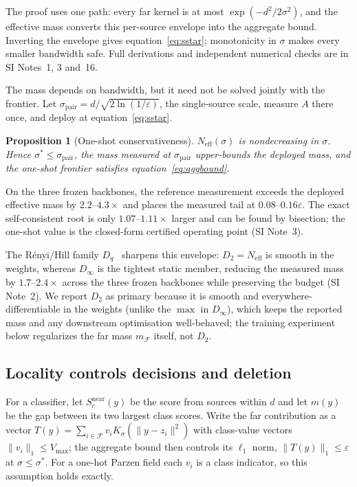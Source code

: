 \documentclass[10pt,twocolumn]{article}
\newtheorem{proposition}{Proposition}
\newcommand{\Ksig}{K_{\sigma}}
\newcommand{\sstar}{\sigma^{*}}
\newcommand{\Neff}{N_{\mathrm{eff}}}
\begin{document}
The proof uses one path: every far kernel is at most $\exp(-d^2/2\sigma^2)$, and the effective mass converts this per-source envelope into the aggregate bound. Inverting the envelope gives equation~\eqref{eq:sstar}; monotonicity in $\sigma$ makes every smaller bandwidth safe. Full derivations and independent numerical checks are in SI Notes~1, 3 and~16.

The mass depends on bandwidth, but it need not be solved jointly with the frontier. Let $\sigma_{\mathrm{pair}}=d/\sqrt{2\ln(1/\varepsilon)}$, the single-source scale, measure $A$ there once, and deploy at equation~\eqref{eq:sstar}.

\begin{proposition}[One-shot conservativeness]\label{prop:conserv}
$\Neff(\sigma)$ is nondecreasing in $\sigma$. Hence $\sstar\le\sigma_{\mathrm{pair}}$, the mass measured at $\sigma_{\mathrm{pair}}$ upper-bounds the deployed mass, and the one-shot frontier satisfies equation~\eqref{eq:aggbound}.
\end{proposition}

On the three frozen backbones, the reference measurement exceeds the deployed effective mass by $2.2$--$4.3\times$ and places the measured tail at $0.08$--$0.16\varepsilon$. The exact self-consistent root is only $1.07$--$1.11\times$ larger and can be found by bisection; the one-shot value is the closed-form certified operating point (SI Note~3).

The R\'enyi/Hill family $D_q$~\cite{hill1973,renyi1961} sharpens this envelope: $D_2=\Neff$ is smooth in the weights, whereas $D_{\infty}$ is the tightest static member, reducing the measured mass by $1.7$--$2.4\times$ across the three frozen backbones while preserving the budget (SI Note~2). We report $D_2$ as primary because it is smooth and everywhere-differentiable in the weights (unlike the $\max$ in $D_{\infty}$), which keeps the reported mass and any downstream optimisation well-behaved; the training experiment below regularizes the far mass $m_{\mathcal{F}}$ itself, not $D_2$.

\subsection{Locality controls decisions and deletion}\label{sec:locality}

For a classifier, let $S_c^{\mathrm{near}}(y)$ be the score from sources within $d$ and let $m(y)$ be the gap between its two largest class scores. Write the far contribution as a vector $T(y)=\sum_{i\in\mathcal{F}}v_i\Ksig(\lVert y-z_i\rVert^2)$ with class-value vectors $\lVert v_i\rVert_1\le V_{\max}$; the aggregate bound then controls its $\ell_1$ norm, $\lVert T(y)\rVert_1\le\varepsilon$ at $\sigma\le\sstar$. For a one-hot Parzen field each $v_i$ is a class indicator, so this assumption holds exactly.
\end{document}

